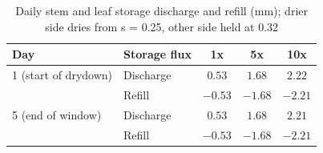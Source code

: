 \begin{table}[H]
\centering
\caption{Daily stem and leaf storage discharge and refill (mm); drier side dries from s = 0.25, other side held at 0.32}
\label{tab:vwt_s2_one_daily_storage}
\begin{tabular}{llccc}
\hline
Day & Storage flux & 1x & 5x & 10x \\
\hline
1 (start of drydown) & Discharge & $0.53$ & $1.68$ & $2.22$ \\
 & Refill & $-0.53$ & $-1.68$ & $-2.21$ \\
\hline
5 (end of window) & Discharge & $0.53$ & $1.68$ & $2.21$ \\
 & Refill & $-0.53$ & $-1.68$ & $-2.21$ \\
\hline
\end{tabular}
\end{table}
